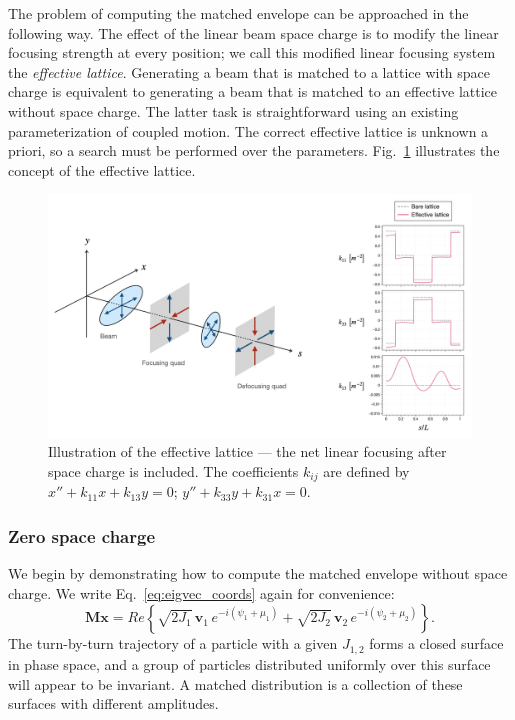 The problem of computing the matched envelope can be approached in the following way. The effect of the linear beam space charge is to modify the linear focusing strength at every position; we call this modified linear focusing system the \textit{effective lattice}. Generating a beam that is matched to a lattice with space charge is equivalent to generating a beam that is matched to an effective lattice without space charge. The latter task is straightforward using an existing parameterization of coupled motion. The correct effective lattice is unknown a priori, so a search must be performed over the parameters. Fig.~\ref{fig:effective_lattice} illustrates the concept of the effective lattice.
%
\begin{figure}
    \centering
    \vspace*{1cm}
    \includegraphics[width=1.0\textwidth]{Images/chapter2/effective_lattice.png}
    \caption{Illustration of the effective lattice — the net linear focusing after space charge is included. The coefficients $k_{ij}$ are defined by $x'' + k_{11}x + k_{13}y = 0$; $y'' + k_{33}y + k_{31}x = 0$.}
    \label{fig:effective_lattice}
    \vspace*{1cm}
\end{figure}
%

\subsubsection{Zero space charge}

We begin by demonstrating how to compute the matched envelope without space charge. We write Eq.~\eqref{eq:eigvec_coords} again for convenience:
%
\begin{equation}
    \mathbf{Mx} = Re \left\{
        \sqrt{2 J_1} \, \mathbf{v}_1 \, e^{-i(\psi_1 + \mu_1)}
        + \sqrt{2 J_2} \, \mathbf{v}_2 \, e^{-i(\psi_2 + \mu_2)}
    \right\}.
\end{equation}
%
The turn-by-turn trajectory of a particle with a given $J_{1,2}$ forms a closed surface in phase space, and a group of particles distributed uniformly over this surface will appear to be invariant. A matched distribution is a collection of these surfaces with different amplitudes.


